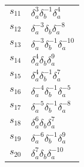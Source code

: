 \documentclass{article}
\begin{document}
\begin{center}
\begin{tabular}{ll}
$s_{11}$ & $\delta_a^{3}\delta_b^{-1}\delta_a^{4}$ \\
$s_{12}$ & $\delta_a^{-3}\delta_b^{}\delta_a^{-8}$ \\
$s_{13}$ & $\delta_a^{-3}\delta_b^{-1}\delta_a^{-10}$ \\
$s_{14}$ & $\delta_a^{4}\delta_b^{}\delta_a^{9}$ \\
$s_{15}$ & $\delta_a^{4}\delta_b^{-1}\delta_a^{7}$ \\
$s_{16}$ & $\delta_a^{-4}\delta_b^{-1}\delta_a^{-5}$ \\
$s_{17}$ & $\delta_a^{-5}\delta_b^{-1}\delta_a^{-8}$ \\
$s_{18}$ & $\delta_a^{6}\delta_b^{}\delta_a^{7}$ \\
$s_{19}$ & $\delta_a^{-6}\delta_b^{-1}\delta_a^{9}$ \\
$s_{20}$ & $\delta_a^{7}\delta_b^{}\delta_a^{-10}$ \\
\bottomrule
\end{tabular}
\end{center}

\thispagestyle{empty}
\end{document}

